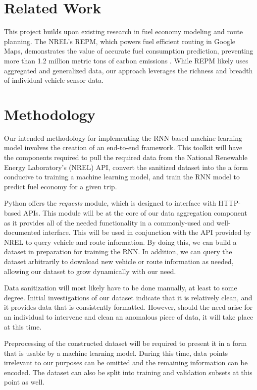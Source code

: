 \documentclass[letterpaper]{article}
\begin{document}
\section{Related Work}

This project builds upon existing research in fuel economy modeling and route planning. 
The NREL's REPM, which powers fuel efficient routing in Google Maps, demonstrates the value of accurate fuel consumption prediction, preventing more than 1.2 million metric tons of carbon emissions \cite{google_2023_environmental_report}.
While REPM likely uses aggregated and generalized data, our approach leverages the richness and breadth of individual vehicle sensor data.


\section{Methodology} %
Our intended methodology for implementing the RNN-based machine learning model involves the creation of an end-to-end
framework. This toolkit will have the components required to pull the required data from the National Renewable
Energy Laboratory's (NREL) API, convert the sanitized dataset into the a form conducive to training a machine learning
model, and train the RNN model to predict fuel economy for a given trip.

Python offers the \emph{requests} module, which is designed to interface with HTTP-based APIs. This module will be at
the core of our data aggregation component as it provides all of the needed functionality in a commonly-used and
well-documented interface. This will be used in conjunction with the API provided by NREL to query vehicle and route
information. By doing this, we can build a dataset in preparation for training the RNN. In addition, we can query the
dataset arbitrarily to download new vehicle or route information as needed, allowing our dataset to grow dynamically
with our need.

Data sanitization will most likely have to be done manually, at least to some degree. Initial investigations of our
dataset indicate that it is relatively clean, and it provides data that is consistently formatted. However, should the
need arise for an individual to intervene and clean an anomalous piece of data, it will take place at this time.

Preprocessing of the constructed dataset will be required to present it in a form that is usable by a machine learning
model. During this time, data points irrelevant to our purposes can be omitted and the remaining information can be
encoded. The dataset can also be split into training and validation subsets at this point as well.
\end{document}
